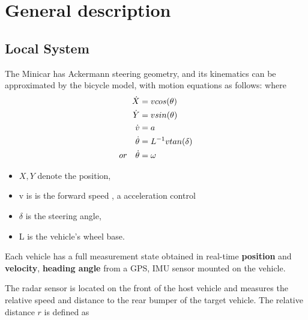 \documentclass[letterpaper, 10pt, conference]{ieeeconf}  %
\begin{document}


\section{General description}\label{sec:genral}
\subsection{Local System}
The Minicar has Ackermann steering geometry, and its kinematics can be approximated by the bicycle model, with motion equations as follows:
where
\begin{align} \label{diff_1_LPV}
    \dot{X} &= v cos(\theta) \\ \notag
    \dot{Y} &= v sin(\theta)\\ \notag
    \dot{v} &= a \\ \notag
    \dot{\theta} &= L^{-1} v tan(\delta)  \\
    or \quad
    \dot{\theta} &= \omega  
\end{align}
\begin{itemize}
    \item $X , Y$ denote the position,
    \item v is is the forward speed , a acceleration control 
    \item $\delta $ is the steering angle,
    \item L is the vehicle's wheel base. 
\end{itemize}

Each vehicle has a full measurement state obtained in real-time \textbf{position} and \textbf{velocity}, \textbf{heading angle} from a GPS, IMU sensor mounted on the vehicle. 

The radar sensor is located on the front of the
 host vehicle and measures the relative speed and distance to the rear bumper of the target
 vehicle. The relative distance $r$ is defined as
\end{document}

